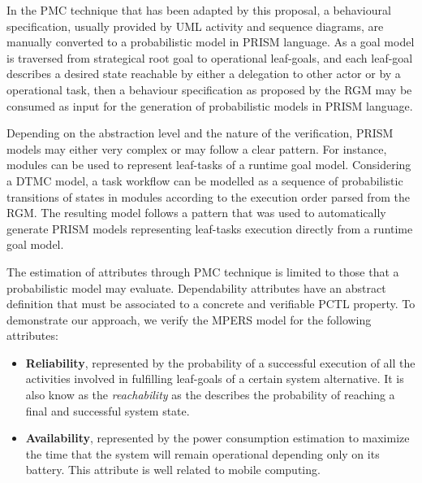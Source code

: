 
In the PMC technique that has been adapted by this proposal, a behavioural specification, usually provided by UML activity and sequence diagrams, are manually converted to a probabilistic model in PRISM language. As a goal model is traversed from strategical root goal to operational leaf-goals, and each leaf-goal describes a desired state reachable by either a delegation to other actor or by a operational task, then a behaviour specification as proposed by the RGM may be consumed as input for the generation of probabilistic models in PRISM language.

Depending on the abstraction level and the nature of the verification, PRISM models may either very complex or may follow a clear pattern. For instance, modules can be used to represent leaf-tasks of a runtime goal model. Considering a DTMC model, a task workflow can be modelled as a sequence of probabilistic transitions of states in modules according to the execution order parsed from the RGM. The resulting model follows a pattern that was used to automatically generate PRISM models representing leaf-tasks execution directly from a runtime goal model.

The estimation of attributes through PMC technique is limited to those that a probabilistic model may evaluate. Dependability attributes have an abstract definition that must be associated to a concrete and verifiable PCTL property. To demonstrate our approach, we verify the MPERS model for the following attributes:

\begin{itemize}

\item \textbf{Reliability}, represented by the probability of a successful execution of all the activities involved in fulfilling leaf-goals of a certain system alternative. It is also know as the \textit{reachability} as the describes the probability of reaching a final and successful system state. 
\bigskip

\item \textbf{Availability}, represented by the power consumption estimation to maximize the time that the system will remain operational depending only on its battery. This attribute is well related to mobile computing. 
\medskip

\end{itemize}




